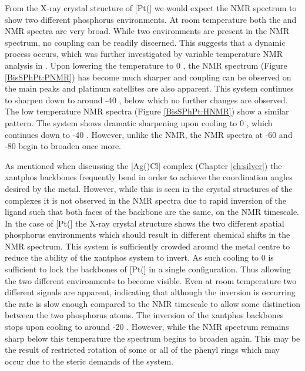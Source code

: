 From the X-ray crystal structure of [Pt(\Phthixantphos{}] we would expect the \phosphorus{} NMR spectrum to show two different phosphorus environments.  At room temperature both the \proton{} and \phosphorus{} NMR spectra are very broad.  While two environments are present in the \phosphorus{} NMR spectrum, no coupling can be readily discerned.  This suggests that a dynamic process occurs, which was further investigated by variable temperature NMR analysis in .  Upon lowering the temperature to 0 \degC, the \phosphorus{} NMR spectrum (Figure \ref{BisSPhPt:PNMR}) has become much sharper and coupling can be observed on the main peaks and platinum satellites are also apparent.  This system continues to sharpen down to around -40 \degC, below which no further changes are observed.  The low temperature \proton{} NMR spectra (Figure \ref{BisSPhPt:HNMR}) show a similar pattern.  The system shows dramatic sharpening upon cooling to 0 \degC, which continues down to -40 \degC.  However, unlike the \phosphorus{} NMR, the \proton{} NMR spectra at -60 and -80 \degC{} begin to broaden once more.

As mentioned when discussing the [Ag(\tButhixantphos)Cl] complex (Chapter \ref{ch:silver}) the xantphos backbones frequently bend in order to achieve the coordination angles desired by the metal.  However, while this is seen in the crystal structures of the complexes it is not observed in the NMR spectra due to rapid inversion of the ligand such that both faces of the backbone are the same, on the NMR timescale.  In the case of [Pt(\Phthixantphos{}] the X-ray crystal structure shows the two different spatial phosphorus environments which should result in different chemical shifts in the \phosphorus{} NMR spectrum.  This system is sufficiently crowded around the metal centre to reduce the ability of the xantphos system to invert.  As such cooling to 0 \degC{} is sufficient to lock the backbones of [Pt(\Phthixantphos{}] in a single configuration.  Thus allowing the two different \phosphorus{} environments to become visible.  Even at room temperature two different signals are apparent, indicating that although the inversion is occurring the rate is slow enough compared to the NMR timescale to allow some distinction between the two phosphorus atoms.  The inversion of the xantphos backbones stops upon cooling to around -20 \degC.  However, while the \phosphorus{} NMR spectrum remains sharp below this temperature the \proton{} spectrum begins to broaden again.  This may be the result of restricted rotation of some or all of the phenyl rings which may occur due to the steric demands of the system.  

